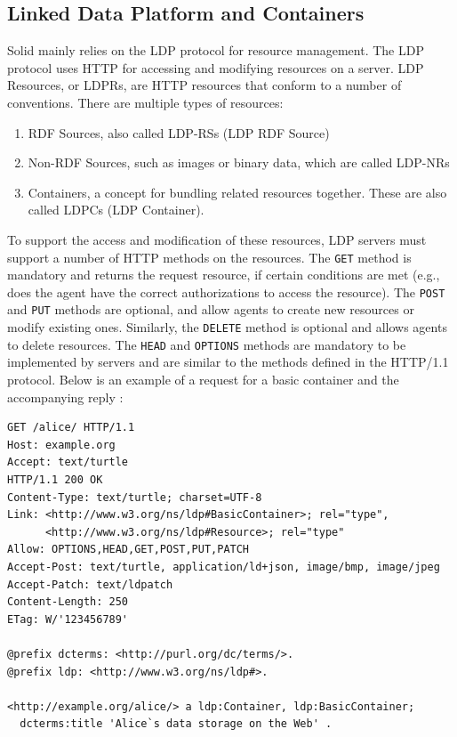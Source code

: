 \subsection{Linked Data Platform and Containers}
\label{subsec:ldp}
Solid mainly relies on the \gls{LDP} protocol \citep{ldp} for resource management. The \gls{LDP} protocol uses HTTP for accessing and modifying resources on a server. LDP Resources, or LDPRs, are HTTP resources that conform to a number of conventions. There are multiple types of resources:
\begin{enumerate}
    \item \gls{RDF} Sources, also called LDP-RSs (LDP \gls{RDF} Source)
    \item Non-\gls{RDF} Sources, such as images or binary data, which are called LDP-NRs
    \item Containers, a concept for bundling related resources together. These are also called LDPCs (LDP Container). 
\end{enumerate}

\noindent To support the access and modification of these resources, \gls{LDP} servers must support a number of HTTP methods on the resources. The \texttt{GET} method is mandatory and returns the request resource, if certain conditions are met (e.g., does the agent have the correct authorizations to access the resource). The \texttt{POST} and \texttt{PUT} methods are optional, and allow agents to create new resources or modify existing ones. Similarly, the \texttt{DELETE} method is optional and allows agents to delete resources. The \texttt{HEAD} and \texttt{OPTIONS} methods are mandatory to be implemented by servers and are similar to the methods defined in the HTTP/1.1 protocol. Below is an example of a request for a basic container and the accompanying reply \citep{ldp-primer}:

\begin{verbatim}
GET /alice/ HTTP/1.1
Host: example.org
Accept: text/turtle
HTTP/1.1 200 OK 
Content-Type: text/turtle; charset=UTF-8
Link: <http://www.w3.org/ns/ldp#BasicContainer>; rel="type", 
      <http://www.w3.org/ns/ldp#Resource>; rel="type"
Allow: OPTIONS,HEAD,GET,POST,PUT,PATCH
Accept-Post: text/turtle, application/ld+json, image/bmp, image/jpeg
Accept-Patch: text/ldpatch
Content-Length: 250
ETag: W/'123456789'
	
@prefix dcterms: <http://purl.org/dc/terms/>.
@prefix ldp: <http://www.w3.org/ns/ldp#>.
	
<http://example.org/alice/> a ldp:Container, ldp:BasicContainer;
  dcterms:title 'Alice`s data storage on the Web' .	
\end{verbatim}

